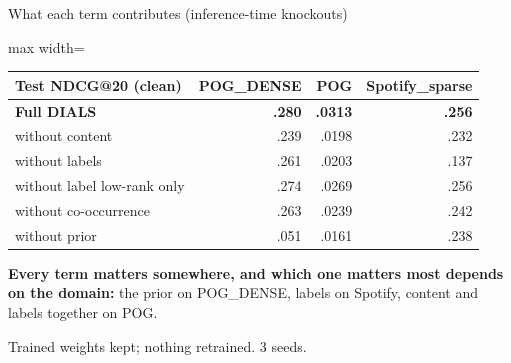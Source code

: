 \documentclass[10pt,aspectratio=169]{beamer}
\newcommand{\key}[1]{\textcolor{Accent}{\textbf{#1}}}
\newcommand{\fn}[1]{\textcolor{Muted}{\scriptsize #1}}
\begin{document}
\begin{frame}{What each term contributes (inference-time knockouts)}
\centering\renewcommand{\arraystretch}{1.3}
\begin{adjustbox}{max width=\textwidth}\begin{tabular}{lrrr}\toprule
Test NDCG@20 (clean) & POG\_DENSE & POG & Spotify\_sparse\\\midrule
\key{Full DIALS} & \textbf{.280} & \textbf{.0313} & \textbf{.256}\\
without content & .239 & .0198 & .232\\
without labels & .261 & .0203 & .137\\
\quad without label low-rank only & .274 & .0269 & .256\\
without co-occurrence & .263 & .0239 & .242\\
without prior & .051 & .0161 & .238\\\bottomrule
\end{tabular}\end{adjustbox}\par
\raggedright\vspace{3mm}
\key{Every term matters somewhere, and which one matters most depends on the domain:} the prior on POG\_DENSE, labels on Spotify, content and labels together on POG.\par
\vspace{2mm}\fn{Trained weights kept; nothing retrained. 3 seeds.}
\end{frame}
\end{document}

